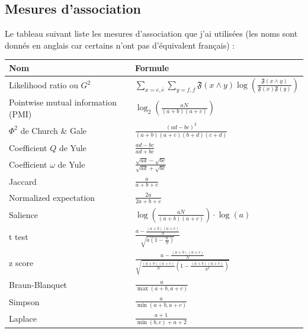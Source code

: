 \documentclass[a4paper,10pt]{article}
\begin{document}
\subsection{Mesures d'association}

\label{listedesmesures}

Le tableau suivant liste les mesures d'association que j'ai utilisées (les noms sont donnés en anglais car certains n'ont pas d'équivalent français) :

\begin{tabular}{|l|l|}
\hline
Nom & Formule \\
\hline
Likelihood ratio ou $G^2$

& $\sum_{x=e,\overline{e}}\sum_{y=f,\overline{f}}\mathfrak{F}(x\wedge y)\log\left(\frac{\mathfrak{F}(x\wedge y)}{\mathfrak{F}(x)\mathfrak{F}(y)}\right)$ \\

Pointwise %
 mutual information (PMI)  & $\log_2(\frac{aN}{(a+b)(a+c)})$ \\


$\Phi^2$ de Church \& Gale & $\frac{(ad-bc)^2}{(a+b)(a+c)(b+d)(c+d)}$ \\

Coefficient $Q$ de Yule & $\frac{ad-bc}{ad+bc}$ \\

Coefficient $\omega$ de Yule & $\frac{\sqrt{ad}-\sqrt{bc}}{\sqrt{ad}+\sqrt{bc}}$ \\


Jaccard & $\frac{a}{a+b+c}$ \\

Normalized expectation & $\frac{2a}{2a+b+c}$ \\

Salience & $\log\left(\frac{aN}{(a+b)(a+c)}\right)\cdot\log(a)$  \\

t test & $\frac{a-\frac{(a+b)(a+c)}{N}}{\sqrt{a(1-\frac{a}{N})}}$ \\

z score & $\frac{a-\frac{(a+b)(a+c)}{N}}{\sqrt{\frac{(a+b)(a+c)}{N}(1-\frac{(a+b)(a+c)}{N^2})}}$ \\

Braun-Blanquet & $\frac{a}{\max(a+b,a+c)}$ \\

Simpson & $\frac{a}{\min(a+b,a+c)}$ \\

Laplace & $\frac{a+1}{\min(b,c)+a+2}$ \\

\hline
\end{tabular}
\end{document}
